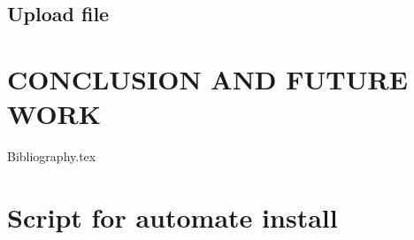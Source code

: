 \documentclass[12pt, a4paper,titlepage, fleqn]{report}%
\begin{document}
	\section{Upload file}
	
\chapter{CONCLUSION AND FUTURE WORK}

{Bibliography.tex}
\appendix

\chapter{Script for automate install}
\end{document}
